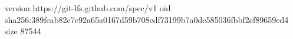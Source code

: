 version https://git-lfs.github.com/spec/v1
oid sha256:389feab82c7c92a65a0167d59b708edf73199b7a0de585036fbbf2ef89659ed4
size 87544
